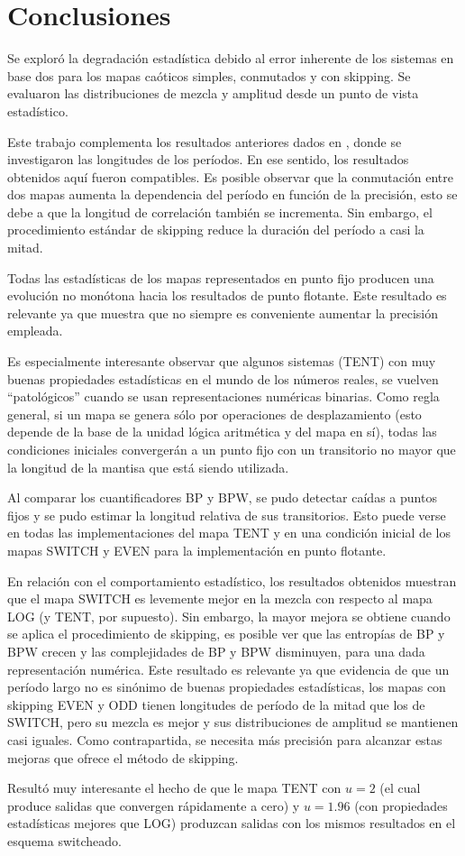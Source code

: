\section{Conclusiones}

Se exploró la degradación estadística debido al error inherente de los sistemas en base dos para los mapas caóticos simples, conmutados y con skipping.
Se evaluaron las distribuciones de mezcla y amplitud desde un punto de vista estadístico.

Este trabajo complementa los resultados anteriores dados en \cite{Nagaraj2008}, donde se investigaron las longitudes de los períodos.
En ese sentido, los resultados obtenidos aquí fueron compatibles.
Es posible observar que la conmutación entre dos mapas aumenta la dependencia del período en función de la precisión, esto se debe a que la longitud de correlación también se incrementa.
Sin embargo, el procedimiento estándar de skipping reduce la duración del período a casi la mitad.

Todas las estadísticas de los mapas representados en punto fijo producen una evolución no monótona hacia los resultados de punto flotante.
Este resultado es relevante ya que muestra que no siempre es conveniente aumentar la precisión empleada.

Es especialmente interesante observar que algunos sistemas (TENT) con muy buenas propiedades estadísticas en el mundo de los números reales, se vuelven ``patológicos'' cuando se usan representaciones numéricas binarias.
Como regla general, si un mapa se genera sólo por operaciones de desplazamiento (esto depende de la base de la unidad lógica aritmética y del mapa en sí), todas las condiciones iniciales convergerán a un punto fijo con un transitorio no mayor que la longitud de la mantisa que está siendo utilizada.

Al comparar los cuantificadores BP y BPW, se pudo detectar caídas a puntos fijos y se pudo estimar la longitud relativa de sus transitorios.
Esto puede verse en todas las implementaciones del mapa TENT y en una condición inicial de los mapas SWITCH y EVEN para la implementación en punto flotante.

En relación con el comportamiento estadístico, los resultados obtenidos muestran que el mapa SWITCH es levemente mejor en la mezcla con respecto al mapa LOG (y TENT, por supuesto).
Sin embargo, la mayor mejora se obtiene cuando se aplica el procedimiento de skipping, es posible ver que las entropías de BP y BPW crecen y las complejidades de BP y BPW disminuyen, para una dada representación numérica.
Este resultado es relevante ya que evidencia de que un período largo no es sinónimo de buenas propiedades estadísticas, los mapas con skipping EVEN y ODD tienen longitudes de período de la mitad que los de SWITCH, pero su mezcla es mejor y sus distribuciones de amplitud se mantienen casi iguales.
Como contrapartida, se necesita más precisión para alcanzar estas mejoras que ofrece el método de skipping.

Resultó muy interesante el hecho de que le mapa TENT con $u=2$ (el cual produce salidas que convergen rápidamente a cero) y $u=1.96$ (con propiedades estadísticas mejores que LOG) produzcan salidas con los mismos resultados en el esquema switcheado.